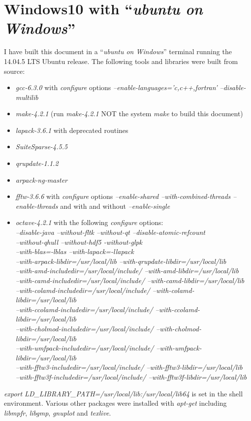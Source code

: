 \documentclass[a4paper,twoside,10pt,english]{report}
\begin{document}
\section*{Windows10 with ``\emph{ubuntu on Windows}''}
I have built this document in a ``\emph{ubuntu on Windows}'' terminal
running the 14.04.5 LTS Ubuntu release. The following tools and libraries were
built from source:
\begin{itemize}
\item \emph{gcc-6.3.0} with \emph{configure} options
\emph{--enable-languages='c,c++,fortran' --disable-multilib}
\item \emph{make-4.2.1} (run \emph{make-4.2.1} NOT the system \emph{make} to
  build this document)
\item \emph{lapack-3.6.1} with deprecated routines
\item \emph{SuiteSparse-4.5.5}
\item \emph{qrupdate-1.1.2}
\item \emph{arpack-ng-master}
\item \emph{fftw-3.6.6} with \emph{configure} options \emph{--enable-shared
    --with-combined-threads --enable-threads} and with and without
  \emph{--enable-single}
\item \emph{octave-4.2.1} with the following \emph{configure} options: \\
\emph{  --disable-java --without-fltk --without-qt --disable-atomic-refcount \\
    --without-qhull --without-hdf5 -without-glpk \\
    --with-blas=-lblas --with-lapack=-llapack \\
    --with-arpack-libdir=/usr/local/lib
    --with-qrupdate-libdir=/usr/local/lib \\
    --with-amd-includedir=/usr/local/include/
    --with-amd-libdir=/usr/local/lib \\
    --with-camd-includedir=/usr/local/include/
    --with-camd-libdir=/usr/local/lib \\ 
    --with-colamd-includedir=/usr/local/include/
    --with-colamd-libdir=/usr/local/lib \\
    --with-ccolamd-includedir=/usr/local/include/ 
    --with-ccolamd-libdir=/usr/local/lib \\
    --with-cholmod-includedir=/usr/local/include/
    --with-cholmod-libdir=/usr/local/lib \\
    --with-umfpack-includedir=/usr/local/include/
    --with-umfpack-libdir=/usr/local/lib \\
    --with-fftw3-includedir=/usr/local/include/
    --with-fftw3-libdir=/usr/local/lib \\
    --with-fftw3f-includedir=/usr/local/include/
    --with-fftw3f-libdir=/usr/local/lib}
\end{itemize}
\emph{export LD\_LIBRARY\_PATH=/usr/local/lib:/usr/local/lib64} is set in the
shell environment. Various other packages were installed with \emph{apt-get}
including \emph{libmpfr}, \emph{libgmp}, \emph{gnuplot} and \emph{texlive}. 
\end{document}
